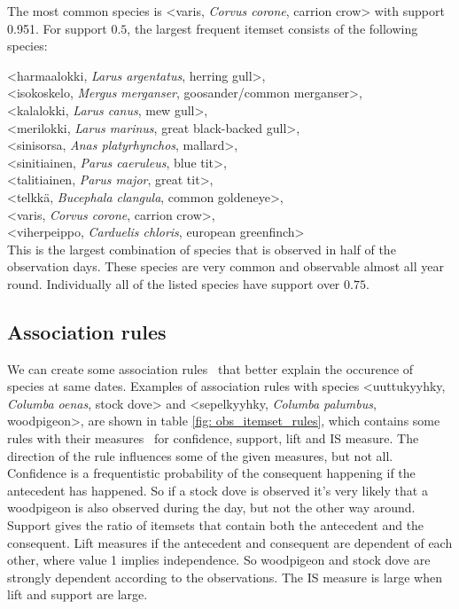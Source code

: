 \documentclass[english]{tktltiki2}
\begin{document}
The most common species is <varis, \emph{Corvus corone}, carrion crow> with support 0.951. For support $0.5$, the largest frequent itemset consists of the following species:

\hangindent=0.7cm
<harmaalokki, \emph{Larus argentatus}, herring gull>, \\
<isokoskelo, \emph{Mergus merganser}, goosander/common merganser>, \\
<kalalokki, \emph{Larus canus}, mew gull>, \\
<merilokki, \emph{Larus marinus}, great black-backed gull>, \\
<sinisorsa, \emph{Anas platyrhynchos}, mallard>, \\
<sinitiainen, \emph{Parus caeruleus}, blue tit>, \\
<talitiainen, \emph{Parus major}, great tit>, \\
<telkkä, \emph{Bucephala clangula}, common goldeneye>, \\
<varis, \emph{Corvus corone}, carrion crow>, \\
<viherpeippo, \emph{Carduelis chloris}, european greenfinch> \\

This is the largest combination of species that is observed in half of the observation days. These species are very common and observable almost all year round. Individually all of the listed species have support over $0.75$.



\subsection{Association rules}

We can create some association rules~\cite{tan2006introduction} that better explain the occurence of species at same dates. Examples of association rules with species <uuttukyyhky, \emph{Columba oenas}, stock dove> and <sepelkyyhky, \emph{Columba palumbus}, woodpigeon>, are shown in table \ref{fig: obs_itemset_rules}, which contains some rules with their measures~\cite{tan2006introduction} for confidence, support, lift and IS measure. The direction of the rule influences some of the given measures, but not all. Confidence is a frequentistic probability of the consequent happening if the antecedent has happened. So if a stock dove is observed it's very likely that a woodpigeon is also observed during the day, but not the other way around. Support gives the ratio of itemsets that contain both the antecedent and the consequent. Lift measures if the antecedent and consequent are dependent of each other, where value 1 implies independence. So woodpigeon and stock dove are strongly dependent according to the observations. The IS measure is large when lift and support are large.
\end{document}
